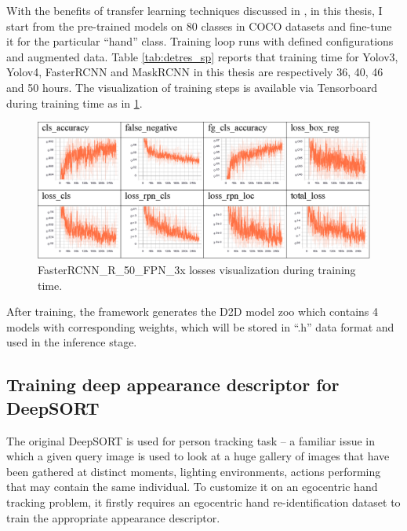 With the benefits of transfer learning techniques discussed in \cite{DBLP:journals/corr/abs-1808-01974}, in this thesis, I start from the pre-trained models on 80 classes in COCO datasets and fine-tune it for the particular “hand” class. Training loop runs with defined configurations and augmented data. Table \ref{tab:detres_sp} reports that training time for Yolov3, Yolov4, FasterRCNN and MaskRCNN in this thesis are respectively 36, 40, 46 and 50 hours. The visualization of training steps is available via Tensorboard during training time as in \ref{fig:tensorboard}.
\begin{figure}
\centerline{\includegraphics[width=1\linewidth]{Figs/tensorboard.png}}
\caption{FasterRCNN\_R\_50\_FPN\_3x losses visualization during training time.}
\label{fig:tensorboard}
\end{figure}
After training, the framework generates the D2D model zoo which contains 4 models with corresponding weights, which will be stored in “.h” data format and used in the inference stage.

\subsection{Training deep appearance descriptor for DeepSORT} \label{subsec:train_deep}
The original DeepSORT is used for person tracking task – a familiar issue in which a given query image is used to look at a huge gallery of images that have been gathered at distinct moments, lighting environments, actions performing that may contain the same individual. To customize it on an egocentric hand tracking problem, it firstly requires an egocentric hand re-identification dataset to train the appropriate appearance descriptor.

